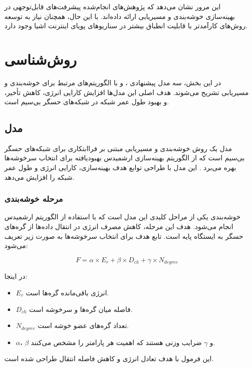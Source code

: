 \documentclass[12pt, onecolumn, a4paper]{article}
\begin{document}
	
	این مرور نشان می‌دهد که پژوهش‌های انجام‌شده پیشرفت‌های قابل‌توجهی در بهینه‌سازی خوشه‌بندی و مسیریابی ارائه داده‌اند. با این حال، همچنان نیاز به توسعه روش‌های کارآمدتر با قابلیت انطباق بیشتر در سناریوهای پویای اینترنت اشیا وجود دارد.
\newpage
	
\section{روش‌شناسی}

در این بخش، سه مدل پیشنهادی ،  و  با الگوریتم‌های مرتبط برای خوشه‌بندی و مسیریابی تشریح می‌شوند. هدف اصلی این مدل‌ها افزایش کارایی انرژی، کاهش تأخیر، و بهبود طول عمر شبکه در شبکه‌های حسگر بی‌سیم است.

\subsection{مدل }
مدل  یک روش خوشه‌بندی و مسیریابی مبتنی بر فراابتکاری برای شبکه‌های حسگر بی‌سیم است که از الگوریتم بهینه‌سازی ارشمیدس بهبودیافته برای انتخاب سرخوشه‌ها بهره می‌برد \cite{ref4, ref5}. این مدل با طراحی توابع هدف بهینه‌سازی، کارایی انرژی و طول عمر شبکه را افزایش می‌دهد.

\subsubsection{مرحله خوشه‌بندی}
خوشه‌بندی یکی از مراحل کلیدی این مدل است که با استفاده از الگوریتم ارشمیدس انجام می‌شود. هدف این مرحله، کاهش مصرف انرژی در انتقال داده‌ها از گره‌های حسگر به ایستگاه پایه است. تابع هدف برای انتخاب سرخوشه‌ها به صورت زیر تعریف می‌شود:

\begin{equation}
	F = \alpha \times E_r + \beta \times D_{ch} + \gamma \times N_{degree}
\end{equation}

در اینجا:
\begin{itemize}
	\item $E_r$ انرژی باقی‌مانده گره‌ها است.
	\item $D_{ch}$ فاصله میان گره‌ها و سرخوشه است.
	\item $N_{degree}$ تعداد گره‌های عضو خوشه است.
	\item $\alpha$، $\beta$ و $\gamma$ ضرایب وزنی هستند که اهمیت هر پارامتر را مشخص می‌کنند.
\end{itemize}

این فرمول با هدف تعادل انرژی و کاهش فاصله انتقال طراحی شده است.
\end{document}

